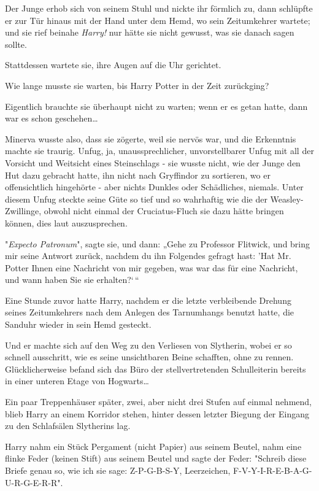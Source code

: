 {Der Junge erhob sich von seinem Stuhl und nickte ihr förmlich zu, dann schlüpfte er zur Tür hinaus mit der Hand unter dem Hemd, wo sein Zeitumkehrer wartete; und sie rief beinahe \emph{Harry!} nur hätte sie nicht gewusst, was sie danach sagen sollte.

Stattdessen wartete sie, ihre Augen auf die Uhr gerichtet.

Wie lange musste sie warten, bis Harry Potter in der Zeit zurückging?

Eigentlich brauchte sie überhaupt nicht zu warten; wenn er es getan hatte, dann war es schon geschehen…

Minerva wusste also, dass sie zögerte, weil sie nervös war, und die Erkenntnis machte sie traurig. Unfug, ja, unaussprechlicher, unvorstellbarer Unfug mit all der Vorsicht und Weitsicht eines Steinschlags - sie wusste nicht, wie der Junge den Hut dazu gebracht hatte, ihn nicht nach Gryffindor zu sortieren, wo er offensichtlich hingehörte - aber nichts Dunkles oder Schädliches, niemals. Unter diesem Unfug steckte seine Güte so tief und so wahrhaftig wie die der Weasley-Zwillinge, obwohl nicht einmal der Cruciatus-Fluch sie dazu hätte bringen können, dies laut auszusprechen.

"\emph{Expecto Patronum}", sagte sie, und dann: „Gehe zu Professor Flitwick, und bring mir seine Antwort zurück, nachdem du ihn Folgendes gefragt hast: 'Hat Mr. Potter Ihnen eine Nachricht von mir gegeben, was war das für eine Nachricht, und wann haben Sie sie erhalten?`\,“

Eine Stunde zuvor hatte Harry, nachdem er die letzte verbleibende Drehung seines Zeitumkehrers nach dem Anlegen des Tarnumhangs benutzt hatte, die Sanduhr wieder in sein Hemd gesteckt.

Und er machte sich auf den Weg zu den Verliesen von Slytherin, wobei er so schnell ausschritt, wie es seine unsichtbaren Beine schafften, ohne zu rennen. Glücklicherweise befand sich das Büro der stellvertretenden Schulleiterin bereits in einer unteren Etage von Hogwarts…

Ein paar Treppenhäuser später, zwei, aber nicht drei Stufen auf einmal nehmend, blieb Harry an einem Korridor stehen, hinter dessen letzter Biegung der Eingang zu den Schlafsälen Slytherins lag.

Harry nahm ein Stück Pergament (nicht Papier) aus seinem Beutel, nahm eine flinke Feder (keinen Stift) aus seinem Beutel und sagte der Feder: "Schreib diese Briefe genau so, wie ich sie sage: Z-P-G-B-S-Y, Leerzeichen, F-V-Y-I-R-E-B-A-G-U-R-G-E-R-R".

}
